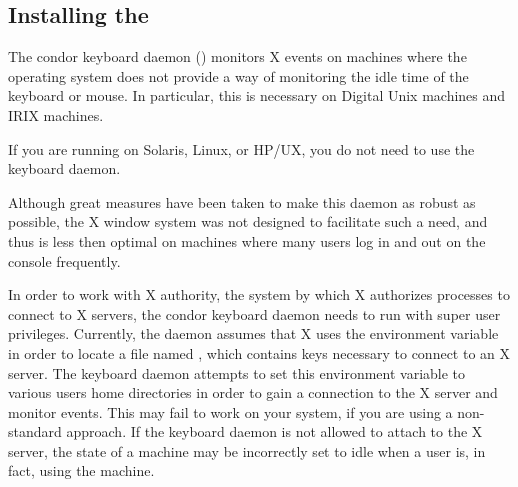 \subsection{Installing the }
\label{sec:kbdd}

The condor keyboard daemon () monitors X events on
machines where the operating system does not provide a way of
monitoring the idle time of the keyboard or mouse.  In particular,
this is necessary on Digital Unix machines and IRIX machines.  

\Note If you are running on Solaris, Linux, or HP/UX, you do
not need to use the keyboard daemon.

Although great measures have been taken to make this daemon as robust
as possible, the X window system was not designed to facilitate such a
need, and thus is less then optimal on machines where many users log
in and out on the console frequently.

In order to work with X authority, the system by which X authorizes
processes to connect to X servers, the condor keyboard daemon needs to
run with super user privileges.  Currently, the daemon assumes that X
uses the  environment variable in order to locate a file
named , which contains keys necessary to connect to
an X server.  The keyboard daemon attempts to set this environment
variable to various users home directories in order to gain a
connection to the X server and monitor events.  This may fail to work
on your system, if you are using a non-standard approach.  If the
keyboard daemon is not allowed to attach to the X server, the state of
a machine may be incorrectly set to idle when a user is, in fact,
using the machine.

